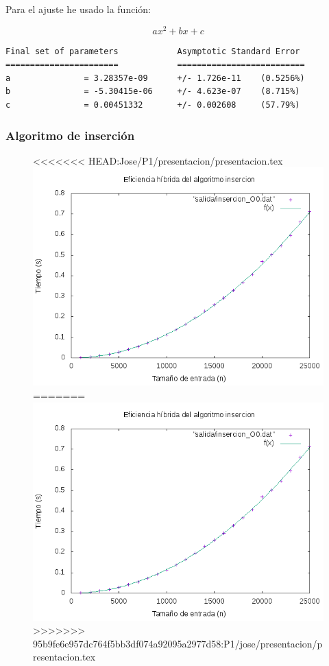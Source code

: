 \documentclass[spanish]{beamer}
\begin{document}
\begin{frame}[fragile]
  Para el ajuste he usado la función:

  $$ax^2+bx+c$$
  
\scriptsize
\begin{verbatim}
Final set of parameters            Asymptotic Standard Error
=======================            ==========================
a               = 3.28357e-09      +/- 1.726e-11    (0.5256%)
b               = -5.30415e-06     +/- 4.623e-07    (8.715%)
c               = 0.00451332       +/- 0.002608     (57.79%)
\end{verbatim}
  
\end{frame}


%
%

\begin{frame}\frametitle{Algoritmo de inserción}
  \begin{figure}[H]
    \centering   
<<<<<<< HEAD:Jose/P1/presentacion/presentacion.tex
        \includegraphics[clip,width=1\columnwidth]{../plots/insercion_O0_fit.png}%
=======
        \includegraphics[clip,width=0.8\columnwidth]{../plots/insercion_O0_fit.png}%
>>>>>>> 95b9fe6e957dc764f5bb3df074a92095a2977d58:P1/jose/presentacion/presentacion.tex
    \end{figure}
\end{frame}
\end{document}
